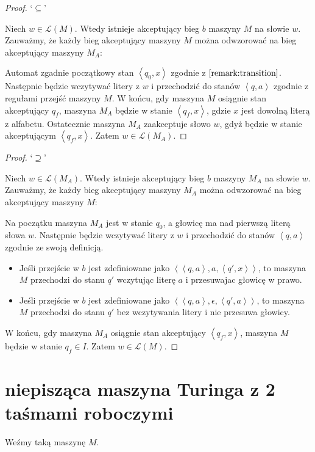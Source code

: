 \documentclass{article}
\theoremstyle{definition}
\theoremstyle{remark}
\begin{document}
\begin{proof}
`\(\subseteq\)'

Niech \(w \in \mathcal{L}(M)\). Wtedy istnieje akceptujący bieg \(b\) maszyny \(M\) na słowie \(w\).
Zauważmy, że każdy bieg akceptujący maszyny \(M\) można odwzorować na bieg akceptujący maszyny \(M_A\):

Automat zgadnie początkowy stan \(\left<q_0,x \right>\) zgodnie z \(\ref{remark:transition}\).
Następnie będzie wczytywać litery z \(w\) i przechodzić do stanów \(\left<q,a\right>\) zgodnie z regułami przejść maszyny \(M\). W końcu, gdy maszyna \(M\) osiągnie stan akceptujący \(q_f\), maszyna \(M_A\) będzie w stanie \(\left<q_f,x\right>\), gdzie \(x\) jest dowolną literą z alfabetu. 
Ostatecznie maszyna \(M_A\) zaakceptuje słowo \(w\), gdyż będzie w stanie akceptującym \(\left<q_f,x\right>\).
Zatem \(w \in \mathcal{L}(M_A)\).
\end{proof}

\begin{proof}
`\(\supseteq\)'

Niech \(w \in \mathcal{L}(M_A)\). Wtedy istnieje akceptujący bieg \(b\) maszyny \(M_A\) na słowie \(w\).
Zauważmy, że każdy bieg akceptujący maszyny \(M_A\) można odwzorować na bieg akceptujący maszyny \(M\):

Na początku maszyna \(M_A\) jest w stanie \(q_0\), a głowicę ma nad pierwszą literą słowa \(w\).
Następnie będzie wczytywać litery z \(w\) i przechodzić do stanów \(\left<q,a\right>\) zgodnie ze swoją definicją.
\begin{itemize}
\item Jeśli przejście w \(b\) jest zdefiniowane jako \( \left< \left<q,a\right>, a, \left<q',x\right> \right> \),
 to maszyna \(M\) przechodzi do stanu \(q'\) wczytując literę \(a\) i przesuwajac głowicę w prawo.
\item Jeśli przejście w \(b\) jest zdefiniowane jako \( \left< \left<q,a\right>, \epsilon, \left<q',a\right> \right> \),
 to maszyna \(M\) przechodzi do stanu \(q'\) bez wczytywania litery i nie przesuwa głowicy.
\end{itemize}

W końcu, gdy maszyna \(M_A\) osiągnie stan akceptujący \(\left<q_f,x\right>\), maszyna \(M\) będzie w stanie \(q_f \in I\).
Zatem \(w \in \mathcal{L}(M)\).
\end{proof}

\section{niepisząca maszyna Turinga z 2 taśmami roboczymi}
Weźmy taką maszynę \(M\).
\end{document}
